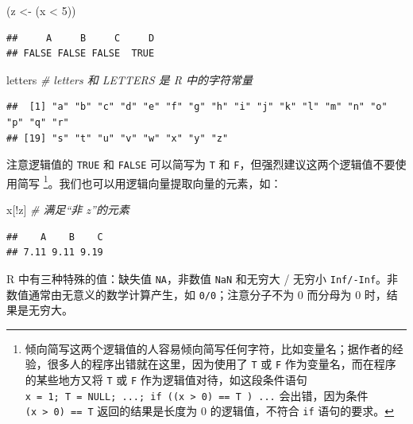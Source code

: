 \documentclass[
  b5paper,
  UTF8,twoside]{book}
\newenvironment{Shaded}{\begin{snugshade}}{\end{snugshade}}
\newcommand{\CommentTok}[1]{\textcolor[rgb]{0.56,0.35,0.01}{\textit{#1}}}
\newcommand{\DecValTok}[1]{\textcolor[rgb]{0.00,0.00,0.81}{#1}}
\newcommand{\NormalTok}[1]{#1}
\newcommand{\OtherTok}[1]{\textcolor[rgb]{0.56,0.35,0.01}{#1}}
\newcommand{\SpecialCharTok}[1]{\textcolor[rgb]{0.00,0.00,0.00}{#1}}
\begin{document}
\begin{Shaded}
\begin{Highlighting}[]
\NormalTok{(z }\OtherTok{\textless{}{-}}\NormalTok{ (x }\SpecialCharTok{\textless{}} \DecValTok{5}\NormalTok{))}
\end{Highlighting}
\end{Shaded}

\begin{verbatim}
##     A     B     C     D 
## FALSE FALSE FALSE  TRUE
\end{verbatim}

\begin{Shaded}
\begin{Highlighting}[]
\NormalTok{letters }\CommentTok{\# letters 和 LETTERS 是 R 中的字符常量}
\end{Highlighting}
\end{Shaded}

\begin{verbatim}
##  [1] "a" "b" "c" "d" "e" "f" "g" "h" "i" "j" "k" "l" "m" "n" "o" "p" "q" "r"
## [19] "s" "t" "u" "v" "w" "x" "y" "z"
\end{verbatim}

注意逻辑值的 \texttt{TRUE} 和 \texttt{FALSE} 可以简写为 \texttt{T} 和 \texttt{F}，但强烈建议这两个逻辑值不要使用简写 \footnote{倾向简写这两个逻辑值的人容易倾向简写任何字符，比如变量名；据作者的经验，很多人的程序出错就在这里，因为使用了 \texttt{T} 或 \texttt{F} 作为变量名，而在程序的某些地方又将 \texttt{T} 或 \texttt{F} 作为逻辑值对待，如这段条件语句 \texttt{x\ =\ 1;\ T\ =\ NULL;\ ...;\ if\ ((x\ \textgreater{}\ 0)\ ==\ T\ )\ ...} 会出错，因为条件 \texttt{(x\ \textgreater{}\ 0)\ ==\ T} 返回的结果是长度为 0 的逻辑值，不符合 \texttt{if} 语句的要求。}。我们也可以用逻辑向量提取向量的元素，如：

\begin{Shaded}
\begin{Highlighting}[]
\NormalTok{x[}\SpecialCharTok{!}\NormalTok{z] }\CommentTok{\# 满足“非 z”的元素}
\end{Highlighting}
\end{Shaded}

\begin{verbatim}
##    A    B    C 
## 7.11 9.11 9.19
\end{verbatim}

R 中有三种特殊的值：缺失值 \texttt{NA}，非数值 \texttt{NaN} 和无穷大 / 无穷小 \texttt{Inf/-Inf}。非数值通常由无意义的数学计算产生，如 \texttt{0/0}；注意分子不为 0 而分母为 0 时，结果是无穷大。
\end{document}
